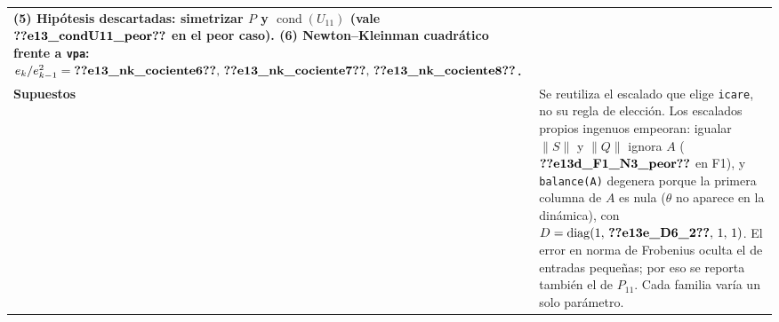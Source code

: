 \begin{recuadro}[title=Ficha de evidencia — E1.3: estudio de estrés numérico]
\begin{tabularx}{\linewidth}{@{}>{\bfseries}p{3.1cm} >{\raggedright\arraybackslash}X@{}}
(5) Hipótesis descartadas: simetrizar $P$ y $\operatorname{cond}(U_{11})$ (vale $\V{e13_condU11_peor}$ en el peor caso).
(6) Newton--Kleinman cuadrático frente a \texttt{vpa}: $e_k/e_{k-1}^2=\V{e13_nk_cociente6},\,\V{e13_nk_cociente7},\,\V{e13_nk_cociente8}$. \\[3pt]
Supuestos &
Se reutiliza el escalado que elige \texttt{icare}, no su regla de elección. Los escalados propios
ingenuos empeoran: igualar $\|S\|$ y $\|Q\|$ ignora $A$ ($\V{e13d_F1_N3_peor}$ en F1), y \texttt{balance(A)}
degenera porque la primera columna de $A$ es nula ($\theta$ no aparece en la dinámica), con
$D=\operatorname{diag}(1,\,\V{e13e_D6_2},\,1,\,1)$. El error en norma de Frobenius oculta el de entradas
pequeñas; por eso se reporta también el de $P_{11}$. Cada familia varía un solo parámetro.
\end{tabularx}
\end{recuadro}

